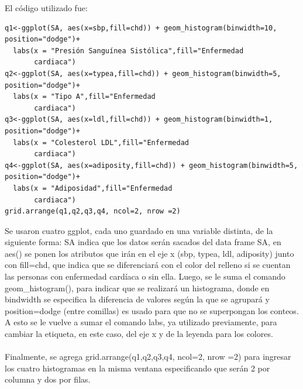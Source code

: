 \documentclass[11pt,a4paper]{article}
\begin{document}
\begin{itemize}
El código utilizado fue:
\begin{verbatim}
q1<-ggplot(SA, aes(x=sbp,fill=chd)) + geom_histogram(binwidth=10, position="dodge")+
  labs(x = "Presión Sanguínea Sistólica",fill="Enfermedad
       cardiaca")
q2<-ggplot(SA, aes(x=typea,fill=chd)) + geom_histogram(binwidth=5, position="dodge")+
  labs(x = "Tipo A",fill="Enfermedad
       cardiaca")
q3<-ggplot(SA, aes(x=ldl,fill=chd)) + geom_histogram(binwidth=1, position="dodge")+
  labs(x = "Colesterol LDL",fill="Enfermedad
       cardiaca")
q4<-ggplot(SA, aes(x=adiposity,fill=chd)) + geom_histogram(binwidth=5, position="dodge")+
  labs(x = "Adiposidad",fill="Enfermedad
       cardiaca")
grid.arrange(q1,q2,q3,q4, ncol=2, nrow =2)
\end{verbatim}

Se usaron cuatro ggplot, cada uno guardado en una variable distinta, de la siguiente forma: SA indica que los datos serán sacados del data frame SA, en aes() se ponen los atributos que irán en el eje x (sbp, typea, ldl, adiposity) junto con fill=chd, que indica que se diferenciará con el color del relleno si se cuentan las personas con enfermedad cardíaca o sin ella. Luego, se le suma el comando geom\_histogram(), para indicar que se realizará un histograma, donde en bindwidth se especifica la diferencia de valores según la que se agrupará y position=dodge (entre comillas) es usado para que no se superpongan los conteos. A esto se le vuelve a sumar el comando labs, ya utilizado previamente, para cambiar la etiqueta, en este caso, del eje x y de la leyenda para los colores.\\
\\
Finalmente, se agrega grid.arrange(q1,q2,q3,q4, ncol=2, nrow =2) para ingresar los cuatro histogramas en la misma ventana especificando que serán 2 por columna y dos por filas.


\end{itemize}
\end{document}
